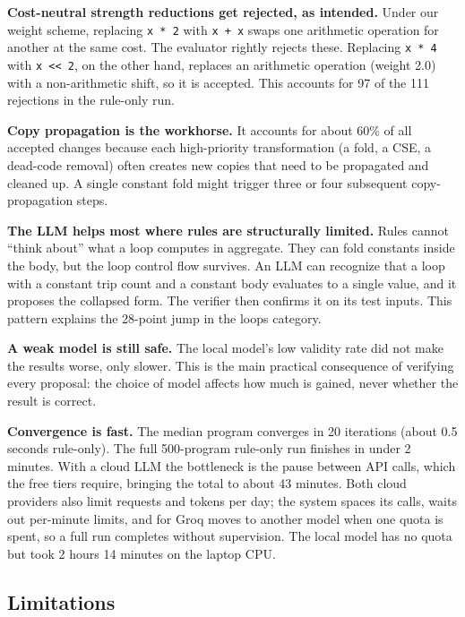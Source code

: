 \documentclass[12pt,a4paper]{report}
\begin{document}
\textbf{Cost-neutral strength reductions get rejected, as intended.} Under our weight scheme, replacing \texttt{x * 2} with \texttt{x + x} swaps one arithmetic operation for another at the same cost. The evaluator rightly rejects these. Replacing \texttt{x * 4} with \texttt{x {<}{<} 2}, on the other hand, replaces an arithmetic operation (weight 2.0) with a non-arithmetic shift, so it is accepted. This accounts for 97 of the 111 rejections in the rule-only run.

\textbf{Copy propagation is the workhorse.} It accounts for about 60\% of all accepted changes because each high-priority transformation (a fold, a CSE, a dead-code removal) often creates new copies that need to be propagated and cleaned up. A single constant fold might trigger three or four subsequent copy-propagation steps.

\textbf{The LLM helps most where rules are structurally limited.} Rules cannot ``think about'' what a loop computes in aggregate. They can fold constants inside the body, but the loop control flow survives. An LLM can recognize that a loop with a constant trip count and a constant body evaluates to a single value, and it proposes the collapsed form. The verifier then confirms it on its test inputs. This pattern explains the 28-point jump in the loops category.

\textbf{A weak model is still safe.} The local model's low validity rate did not make the results worse, only slower. This is the main practical consequence of verifying every proposal: the choice of model affects how much is gained, never whether the result is correct.

\textbf{Convergence is fast.} The median program converges in 20 iterations (about 0.5 seconds rule-only). The full 500-program rule-only run finishes in under 2 minutes. With a cloud LLM the bottleneck is the pause between API calls, which the free tiers require, bringing the total to about 43 minutes. Both cloud providers also limit requests and tokens per day; the system spaces its calls, waits out per-minute limits, and for Groq moves to another model when one quota is spent, so a full run completes without supervision. The local model has no quota but took 2 hours 14 minutes on the laptop CPU.

\subsection{Limitations}
\end{document}
